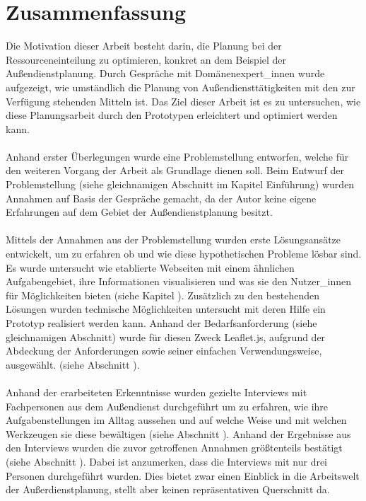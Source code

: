 \documentclass[Bachelorarbeit.tex]{subfiles}
\begin{document}
\section{Zusammenfassung}
Die Motivation dieser Arbeit besteht darin, die Planung bei der Ressourceneinteilung zu optimieren, konkret an dem Beispiel der Außendienstplanung. 
Durch Gespräche mit Domänenexpert\_innen wurde aufgezeigt, wie umständlich die Planung von Außendiensttätigkeiten mit den zur Verfügung stehenden Mitteln ist. Das Ziel dieser Arbeit ist es zu untersuchen, wie diese Planungsarbeit durch den Prototypen erleichtert und optimiert werden kann.\\
\\
Anhand erster Überlegungen wurde eine Problemstellung entworfen, welche für den weiteren Vorgang der Arbeit als Grundlage dienen soll.
Beim Entwurf der Problemstellung (siehe gleichnamigen Abschnitt im Kapitel Einführung) wurden Annahmen auf Basis der Gespräche gemacht, da der Autor keine eigene Erfahrungen auf dem Gebiet der Außendienstplanung besitzt.\\
\\
Mittels der Annahmen aus der Problemstellung wurden erste Lösungsansätze entwickelt, um zu erfahren ob und wie diese hypothetischen Probleme lösbar sind.
Es wurde untersucht wie etablierte Webseiten mit einem ähnlichen Aufgabengebiet, ihre Informationen visualisieren und was sie den Nutzer\_innen für Möglichkeiten bieten (siehe Kapitel ). 
Zusätzlich zu den bestehenden Lösungen wurden technische Möglichkeiten untersucht mit deren Hilfe ein Prototyp realisiert werden kann.
Anhand der Bedarfsanforderung (siehe gleichnamigen Abschnitt) wurde für diesen Zweck Leaflet.js, aufgrund der Abdeckung der Anforderungen sowie seiner einfachen Verwendungsweise, ausgewählt.  (siehe Abschnitt ).\\
\\
Anhand der erarbeiteten Erkenntnisse wurden gezielte Interviews mit Fachpersonen aus dem Außendienst durchgeführt um zu erfahren, wie ihre Aufgabenstellungen im Alltag aussehen und auf welche Weise und mit welchen Werkzeugen sie diese bewältigen (siehe Abschnitt ). 
Anhand der Ergebnisse aus den Interviews wurden die zuvor getroffenen Annahmen größtenteils bestätigt (siehe Abschnitt ).
Dabei ist anzumerken, dass die Interviews mit nur drei Personen durchgeführt wurden. 
Dies bietet zwar einen Einblick in die Arbeitswelt der Außerdienstplanung, stellt aber keinen repräsentativen Querschnitt da.
\end{document}
